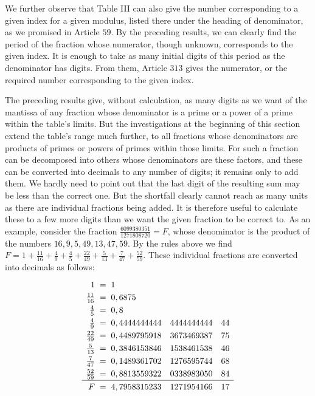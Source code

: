 We further observe that Table III can also give the number corresponding to a given index for a given modulus, listed there under the heading of denominator, as we promised in Article \(59\). By the preceding results, we can clearly find the period of the fraction whose numerator, though unknown, corresponds to the given index. It is enough to take as many initial digits of this period as the denominator has digits. From them, Article \(313\) gives the numerator, or the required number corresponding to the given index.

The preceding results give, without calculation, as many digits as we want of the mantissa of any fraction whose denominator is a prime or a power of a prime within the table's limits. But the investigations at the beginning of this section extend the table's range much further, to all fractions whose denominators are products of primes or powers of primes within those limits. For such a fraction can be decomposed into others whose denominators are these factors, and these can be converted into decimals to any number of digits; it remains only to add them. We hardly need to point out that the last digit of the resulting sum may be less than the correct one. But the shortfall clearly cannot reach as many units as there are individual fractions being added. It is therefore useful to calculate these to a few more digits than we want the given fraction to be correct to. As an example, consider the fraction \(\frac{6099380351}{1271808720}=F\), whose denominator is the product of the numbers
\(16,\allowbreak 9,\allowbreak 5,\allowbreak 49,\allowbreak 13,\allowbreak 47,\allowbreak 59\). By the rules above we find \(F=1+\frac{11}{16}+\frac49+\frac45+\frac{22}{49}+\frac5{13}+\frac7{47}+\frac{52}{59}\). These individual fractions are converted into decimals as follows:
\[\renewcommand{\arraystretch}{1.25}\begin{array}{r@{\;}c@{\;}l@{\quad}l@{\quad}l}
1&{}={}&1&&\\
\frac{11}{16}&{}={}&0,6875&&\\
\frac45&{}={}&0,8&&\\
\frac49&{}={}&0,4444444444&4444444444&44\\
\frac{22}{49}&{}={}&0,4489795918&3673469387&75\\
\frac5{13}&{}={}&0,3846153846&1538461538&46\\
\frac7{47}&{}={}&0,1489361702&1276595744&68\\
\frac{52}{59}&{}={}&0,8813559322&0338983050&84\\\hline
F&{}={}&4,7958315233&1271954166&17
\end{array}\]
